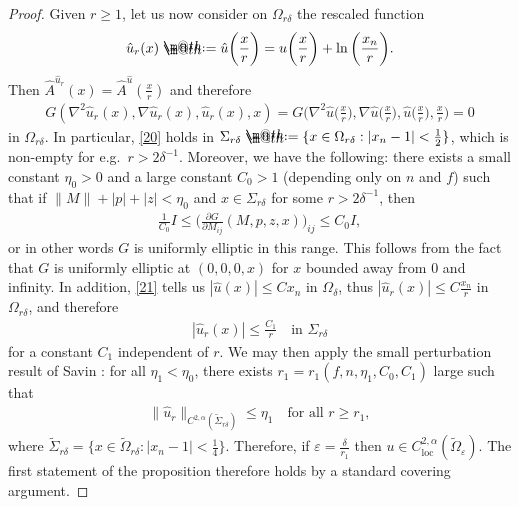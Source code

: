 \documentclass[12pt]{article}
\makeatletter
\numberwithin{equation}{section}
\theoremstyle{plain}
\theoremstyle{definition}
\newcommand{\ep}{\varepsilon}
\newcommand*{\defeq}{\mathrel{\rlap{%
			\raisebox{0.3ex}{$\m@th\cdot$}}%
		\raisebox{-0.3ex}{$\m@th\cdot$}}%
	=}
\makeatother
\begin{document}
\begin{proof}
	Given $r\geq 1$, let us now consider on $\Omega_{r\delta}$ the rescaled function 
	\begin{align*}
	\hat{u}_r(x) \defeq \hat{u}\bigg(\frac{x}{r}\bigg) = u\bigg(\frac{x}{r}\bigg) + \ln\bigg(\frac{x_n}{r}\bigg). 
	\end{align*}
	Then $\hat{A}^{\hat{u}_r}(x) = \hat{A}^{\hat{u}}(\frac{x}{r})$ and therefore
	\begin{align}\label{20}
	G(\nabla^2 \hat{u}_r(x), \nabla \hat{u}_r(x), \hat{u}_r(x), x) = G\bigg(\nabla^2 \hat{u}\Big(\frac{x}{r}\Big), \nabla \hat{u}\Big(\frac{x}{r}\Big), \hat{u}\Big(\frac{x}{r}\Big), \frac{x}{r}\bigg) = 0
	\end{align}
	in $\Omega_{r\delta}$. In particular, \eqref{20} holds in $\Sigma_{r\delta}\defeq\{x\in \Omega_{r\delta}: |x_n-1|<\frac{1}{2}\}$, which is non-empty for e.g.~$r>2\delta^{-1}$. Moreover, we have the following: there exists a small constant $\eta_0>0$ and a large constant $C_0>1$ (depending only on $n$ and $f$) such that if $\|M\| + |p| + |z| < \eta_0$ and $x\in \Sigma_{r\delta}$ for some $r> 2\delta^{-1}$, then 
	\begin{align*}
	\frac{1}{C_0}I \leq \bigg(\frac{\partial G}{\partial M_{ij}}(M,p,z,x)\bigg)_{ij} \leq C_0 I,
	\end{align*}
	or in other words $G$ is uniformly elliptic in this range. This follows from the fact that $G$ is uniformly elliptic at $(0,0,0,x)$ for $x$ bounded away from 0 and infinity. In addition, \eqref{21} tells us $|\hat{u}(x)| \leq Cx_n$ in $\Omega_{\delta}$, thus $|\hat{u}_r(x)| \leq C\frac{x_n}{r}$ in $\Omega_{r\delta}$, and therefore
	\begin{align*}
	|\hat{u}_r(x)| \leq \frac{C_1}{r} \quad \text{in }\Sigma_{r\delta}
	\end{align*}
	for a constant $C_1$ independent of $r$. We may then apply the small perturbation result of Savin \cite{Sav07}: for all $\eta_1<\eta_0$, there exists $r_1 = r_1(f,n,\eta_1,C_0, C_1)$ large such that 
	\begin{align*}
	\|\hat{u}_r\|_{C^{2,\alpha}(\widetilde{\Sigma}_{r\delta})} \leq \eta_1 \quad \text{for all }r \geq r_1,
	\end{align*}
	where $\widetilde{\Sigma}_{r\delta} = \{x\in \widetilde{\Omega}_{r\delta}: |x_n-1|<\frac{1}{4}\}$. Therefore, if $\ep = \frac{\delta}{r_1}$ then $u\in C^{2,\alpha}_{\operatorname{loc}}(\widetilde{\Omega}_{\ep})$. The first statement of the proposition therefore holds by a standard covering argument. \medskip 
	

\end{proof}
\end{document}

